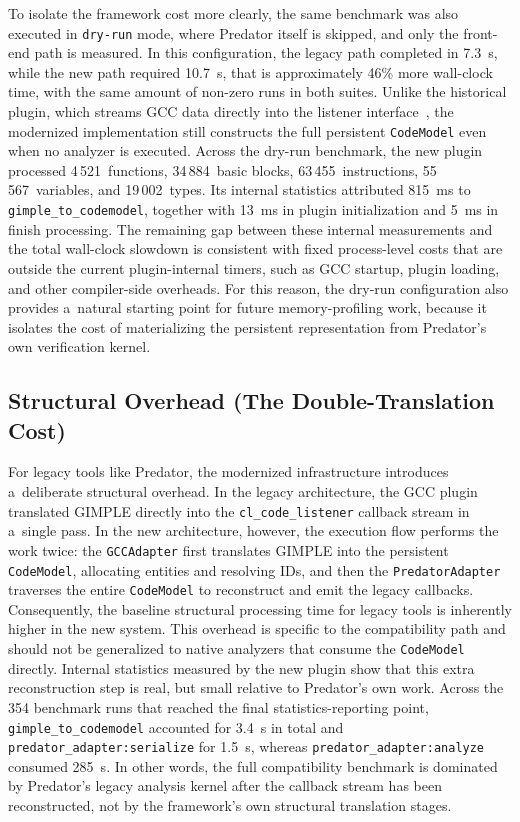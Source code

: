 \documentclass[xpsejal00-gcc-plugin.tex]{subfiles}
\begin{document}
To isolate the framework cost more clearly, the same benchmark was also executed in \texttt{dry-run} mode, where Predator itself is skipped, and only the front-end path is measured.
In this configuration, the legacy path completed in 7.3~s, while the new path required 10.7~s, that is approximately 46\% more wall-clock time, with the same amount of non-zero runs in both suites.
Unlike the historical plugin, which streams GCC data directly into the listener interface~\cite{CodeListener2012}, the modernized implementation still constructs the full persistent \texttt{CodeModel} even when no analyzer is executed.
Across the dry-run benchmark, the new plugin processed 4\,521~functions, 34\,884~basic blocks, 63\,455~instructions, 55\,567~variables, and 19\,002~types.
Its internal statistics attributed 815~ms to \texttt{gimple\_to\_codemodel}, together with 13~ms in plugin initialization and 5~ms in finish processing.
The remaining gap between these internal measurements and the total wall-clock slowdown is consistent with fixed process-level costs that are outside the current plugin-internal timers, such as GCC startup, plugin loading, and other compiler-side overheads.
For this reason, the dry-run configuration also provides a~natural starting point for future memory-profiling work, because it isolates the cost of materializing the persistent representation from Predator's own verification kernel.

\subsection*{Structural Overhead (The Double-Translation Cost)}\label{sec:structural-overhead}

For legacy tools like Predator, the modernized infrastructure introduces a~deliberate structural overhead.
In the legacy architecture, the GCC plugin translated GIMPLE directly into the \texttt{cl\_code\_listener} callback stream in a~single pass.
In the new architecture, however, the execution flow performs the work twice: the \texttt{GCCAdapter} first translates GIMPLE into the persistent \texttt{CodeModel}, allocating entities and resolving IDs, and then the \texttt{PredatorAdapter} traverses the entire \texttt{CodeModel} to reconstruct and emit the legacy callbacks.
Consequently, the baseline structural processing time for legacy tools is inherently higher in the new system.
This overhead is specific to the compatibility path and should not be generalized to native analyzers that consume the \texttt{CodeModel} directly.
Internal statistics measured by the new plugin show that this extra reconstruction step is real, but small relative to Predator's own work.
Across the 354 benchmark runs that reached the final statistics-reporting point, \texttt{gimple\_to\_codemodel} accounted for 3.4~s in total and \texttt{predator\_adapter:serialize} for 1.5~s, whereas \texttt{predator\_adapter:analyze} consumed 285~s.
In other words, the full compatibility benchmark is dominated by Predator's legacy analysis kernel after the callback stream has been reconstructed, not by the framework's own structural translation stages.
\end{document}
